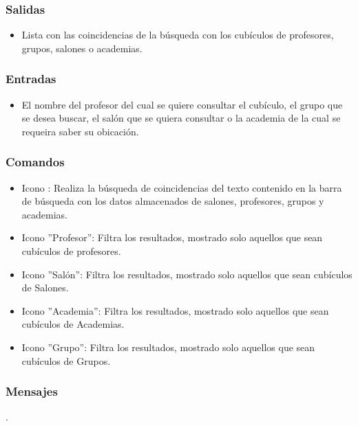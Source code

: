 \pagebreak
{}

\subsubsection{Salidas}
	\begin{itemize}
		\item Lista con las coincidencias de la búsqueda con los cubículos de profesores, grupos, salones o academias.
	\end{itemize}

\subsubsection{Entradas}	
\begin{itemize}
	\item El nombre del profesor del cual se quiere consultar el cubículo, el grupo que se desea buscar, el salón que se quiera consultar o la academia de la cual se requeira saber su obicación.
\end{itemize}

\subsubsection{Comandos}
\begin{itemize}
	\item Icono : Realiza la búsqueda de coincidencias del texto contenido en la barra de búsqueda
	con los datos almacenados de salones, profesores, grupos y academias.
	\item Icono ''Profesor'': Filtra los resultados, mostrado solo aquellos que sean cubículos de profesores.
	\item Icono ''Salón'': Filtra los resultados, mostrado solo aquellos que sean cubículos de Salones.
	\item Icono ''Academia'': Filtra los resultados, mostrado solo aquellos que sean cubículos de Academias.
	\item Icono ''Grupo'': Filtra los resultados, mostrado solo aquellos que sean cubículos de Grupos.
\end{itemize}

\subsubsection{Mensajes}
\begin{Citemize}
	\item {}.
\end{Citemize}

